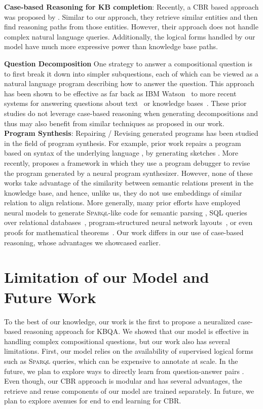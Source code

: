 \documentclass{article}
\newcommand{\spql}{\textsc{Sparql}\xspace}
\begin{document}
\textbf{Case-based Reasoning for KB completion}: Recently, a CBR based approach was proposed by \citet{das2020simple}. Similar to our approach, they retrieve similar entities and then find reasoning paths from those entities. However, their approach does not handle complex natural language queries. Additionally, the logical forms handled by our model have much more expressive power than knowledge base paths.


\textbf{Question Decomposition}
One strategy to answer a compositional question is to first break it down into simpler subquestions, each of which can be viewed as a natural language program describing how to answer the question.
This approach has been shown to be effective as far back as IBM Watson~\cite{ferrucci2010building} to more recent systems for answering questions about text~\cite{das2019multi,min-etal-2019-multi,perez-etal-2020-unsupervised,wolfson2020break} or knowledge bases~\cite{Talmor2018TheWA}.
These prior studies do not leverage case-based reasoning when generating decompositions and thus may also benefit from similar techniques as proposed in our work.\\

\textbf{Program Synthesis}: Repairing / Revising generated programs has been studied in the field of program synthesis. For example, prior work repairs a program based on syntax of the underlying language \cite{le2017s3}, by generating sketches \cite{hua2018towards}. More recently, \citet{gupta2020synthesize} proposes a framework in which they use a program debugger to revise the program generated by a neural program synthesizer. However, none of these works take advantage of the similarity between semantic relations present in the knowledge base, and hence, unlike us, they do not use embeddings of similar relation to align relations. More generally, many prior efforts have employed neural models to generate \spql -like code for semantic parsing \cite{dong2016language,balog2016deepcoder,zhong2017seq2sql}, SQL queries over relational databases~\cite{zhongSeq2SQL2017}, program-structured neural network layouts~\cite{Andreas_2016_CVPR}, or even proofs for mathematical theorems~\cite{polu2020generative}.
Our work differs in our use of case-based reasoning, whose advantages we showcased earlier.

 
\section{Limitation of our Model and Future Work}
\label{sec:limitations}
To the best of our knowledge, our work is the first to propose a neuralized case-based reasoning approach for KBQA. We showed that our model is effective in handling complex compositional questions, but our work also has several limitations. First, our model relies on the availability of supervised logical forms such as \spql queries, which can be expensive to annotate at scale. In the future, we plan to explore ways to directly learn from question-answer pairs \cite{berant2013semantic,liang2016neural}. Even though, our CBR approach is modular and has several advantages, the retrieve and reuse components of our model are trained separately. In future, we plan to explore avenues for end to end learning for CBR. 
\end{document}
